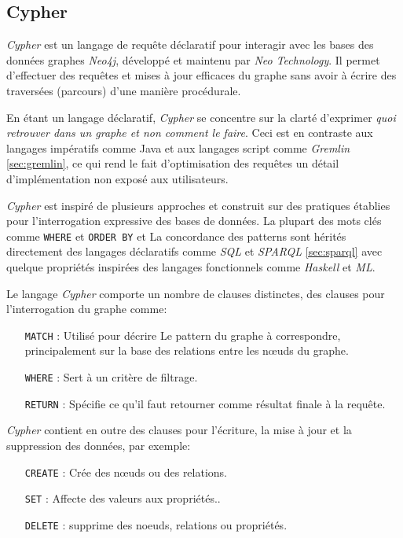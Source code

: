   \subsection{Cypher}
  \label{sec:cypher}
  \emph{Cypher} \cite{cypher-docs} est un langage de requête
  déclaratif pour interagir avec les bases des données graphes
  \emph{Neo4j}, développé et maintenu par \emph{Neo Technology}. Il
  permet d'effectuer des requêtes et mises à jour efficaces du graphe 
  sans avoir à écrire des traversées (parcours) d'une manière
  procédurale.\medskip

  En étant un langage déclaratif, \emph{Cypher} se concentre sur la
  clarté d'exprimer \textit{quoi retrouver dans un graphe et non
  comment le faire}. Ceci est en contraste aux langages impératifs
  comme Java et aux langages script comme \emph{Gremlin}
  \ref{sec:gremlin}, ce qui rend le fait d'optimisation des requêtes un
  détail d'implémentation non exposé aux utilisateurs.\medskip

  \emph{Cypher} est inspiré de plusieurs approches et construit sur
  des pratiques établies pour l'interrogation expressive des bases de
  données. La plupart des mots clés comme \verb|WHERE| et
  \verb|ORDER BY| et La concordance des patterns sont hérités
  directement des langages déclaratifs comme \emph{SQL} et
  \emph{SPARQL} \ref{sec:sparql} avec quelque propriétés inspirées des
  langages fonctionnels comme \emph{Haskell} et \emph{ML}.\medskip

  Le langage \emph{Cypher} comporte un nombre de clauses distinctes,
  des clauses pour l'interrogation du graphe comme:
  \begin{itemize}
  \item [\texttt{MATCH}]: Utilisé pour décrire Le pattern du graphe
    à correspondre, principalement sur la base des relations entre les
    nœuds du graphe.
  \item [\texttt{WHERE}]: Sert à un critère de filtrage.
  \item [\texttt{RETURN}]: Spécifie ce qu'il faut retourner comme
    résultat finale à la requête.
  \end{itemize}
  \medskip

  \emph{Cypher} contient en outre des clauses pour l'écriture, la mise
  à jour et la suppression des données, par exemple:

  \begin{itemize}
  \item [\texttt{CREATE}]: Crée des nœuds ou des relations.
  \item [\texttt{SET}]: Affecte des valeurs aux propriétés..
  \item [\texttt{DELETE}]: supprime des noeuds, relations ou propriétés.
  \end{itemize}

